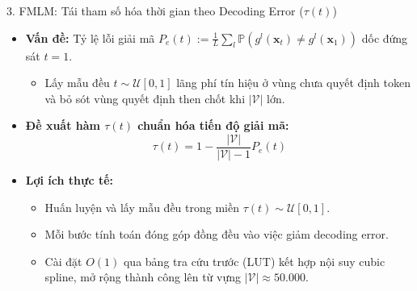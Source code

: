 \begin{frame}{3. FMLM: Tái tham số hóa thời gian theo Decoding Error ($\tau(t)$)}
    \begin{itemize}
        \item \textbf{Vấn đề:} Tỷ lệ lỗi giải mã $P_e(t) := \frac{1}{L}\sum_l \mathbb{P}(g^l(\mathbf{x}_t) \ne g^l(\mathbf{x}_1))$ dốc đứng sát $t = 1$.
        \begin{itemize}
            \item Lấy mẫu đều $t \sim \mathcal{U}[0, 1]$ lãng phí tín hiệu ở vùng chưa quyết định token và bỏ sót vùng quyết định then chốt khi $|\mathcal{V}|$ lớn.
        \end{itemize}
        \item \textbf{Đề xuất hàm $\tau(t)$ chuẩn hóa tiến độ giải mã:}
        $$\tau(t) = 1 - \frac{|\mathcal{V}|}{|\mathcal{V}| - 1} P_e(t)$$
        \item \textbf{Lợi ích thực tế:}
        \begin{itemize}
            \item Huấn luyện và lấy mẫu đều trong miền $\tau(t) \sim \mathcal{U}[0, 1]$.
            \item Mỗi bước tính toán đóng góp đồng đều vào việc giảm decoding error.
            \item Cài đặt $O(1)$ qua bảng tra cứu trước (LUT) kết hợp nội suy cubic spline, mở rộng thành công lên từ vựng $|\mathcal{V}| \approx 50.000$.
        \end{itemize}
    \end{itemize}
\end{frame}

